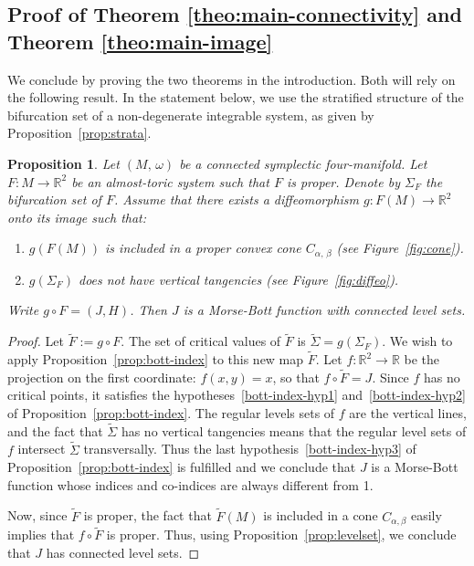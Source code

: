 \documentclass[11pt]{article}
\newtheorem{prop}[theorem]{Proposition}
\newcommand{\RM}{\mathbb{R}}
\begin{document}
\subsection{Proof of Theorem \ref{theo:main-connectivity} and Theorem
  \ref{theo:main-image}}

We conclude by proving the two theorems in the introduction. Both will
rely on the following result. In the statement below, we use the
stratified structure of the bifurcation set of a non-degenerate
integrable system, as given by Proposition~\ref{prop:strata}.

\begin{prop} \label{prop:J-connected} Let $(M,\, \omega)$ be a
  connected symplectic four-manifold.  Let $F\colon M \to
  \mathbb{R}^2$ be an almost\--toric system such that $F$ is proper.
  Denote by $\Sigma_F$ the bifurcation set of $F$. Assume that there
  exists a diffeomorphism $g \colon F(M) \to \mathbb{R}^2$ onto its
  image such that:
  \begin{enumerate}[{\rm (i)}]
  \item \label{hyp:cone} $g(F(M))$ is included in a proper convex cone
    $C_{\alpha,\, \beta}$ (see Figure~\ref{fig:cone}).
  \item \label{hyp:tangencies} $g(\Sigma_F)$ does not have vertical
    tangencies (see Figure~\ref{fig:diffeo}).
  \end{enumerate}
  Write $g\circ F = (J,H)$. Then $J$ is a Morse-Bott function with
  connected level sets.
\end{prop}
\begin{proof}
  Let $\tilde{F}:=g\circ F$. The set of critical values of $\tilde{F}$
  is $\tilde{\Sigma}=g(\Sigma_F)$. We wish to apply
  Proposition~\ref{prop:bott-index} to this new map $\tilde{F}$.  Let
  $f:\RM^2\to\RM$ be the projection on the first coordinate:
  $f(x,y)=x$, so that $f\circ \tilde{F}=J$. Since $f$ has no critical
  points, it satisfies the hypotheses~\eqref{bott-index-hyp1}
  and~\eqref{bott-index-hyp2} of
  Proposition~\ref{prop:bott-index}. The regular levels sets of $f$
  are the vertical lines, and the fact that $\tilde{\Sigma}$ has no
  vertical tangencies means that the regular level sets of $f$
  intersect $\tilde{\Sigma}$ transversally. Thus the last
  hypothesis~\eqref{bott-index-hyp3} of
  Proposition~\ref{prop:bott-index} is fulfilled and we conclude that
  $J$ is a Morse-Bott function whose indices and co-indices are always
  different from 1.

  Now, since $\tilde{F}$ is proper, the fact that $\tilde{F}(M)$ is
  included in a cone $C_{\alpha,\beta}$ easily implies that $f\circ
  \tilde{F}$ is proper.  Thus, using Proposition~\ref{prop:levelset},
  we conclude that $J$ has connected level sets.
\end{proof}
\end{document}
